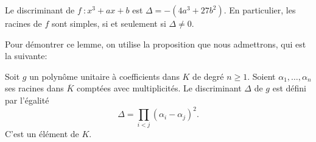 \begin{lemme}
    \label{lem:lemme1}
    Le discriminant de $f\ : x^3 + ax + b$ est $\Delta = -(4a^3 + 27b^2)$. En particulier, les racines de $f$ sont simples, si et seulement si $\Delta \neq 0$.
\end{lemme}

Pour démontrer ce lemme, on utilise la proposition que nous admettrons, qui est la suivante:
\begin{proposition}
    \label{prop:discriminant}
    Soit $g$ un polynôme unitaire à coefficients dans $K$ de degré $n \ge 1$. Soient
    $\alpha_1,\ldots,\alpha_{n}$ ses racines dans $\overline{K}$ comptées avec
    multiplicités. Le discriminant $\Delta$ de $g$ est défini par l'égalité
    \[
    \Delta = \prod_{i<j}^{} \left( \alpha_{i} - \alpha_{j} \right) ^2 
    .\] 
    C'est un élément de $K$.
\end{proposition}

